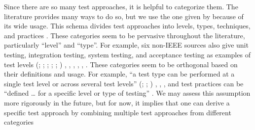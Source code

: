 Since there are so many test approaches, it is helpful to categorize them.
The literature provides many ways to do so, but we use the one given by
\ifnotpaper\else \citeauthor{IEEE2022} \fi \citet{IEEE2022} because of its wide usage.
This schema divides test approaches into levels, types, techniques, and practices
\citeyearpar[Fig.~2; see ]{IEEE2022}. These categories seem
to be pervasive throughout the literature, particularly ``level'' and ``type''.
\label{nonIEEE-sources}%
For example, six non-IEEE sources also give unit testing, integration testing,
system testing, and acceptance testing as examples of test levels \ifnotpaper
    (\citealp[pp.~5\=/6 to 5\=/7]{SWEBOK2025}; \citealpISTQB{};
    \citealp[pp.~807\==808]{Perry2006}; \citealp[pp.~443\==445]{PetersAndPedrycz2000};
    \citealp[p.~218]{KuļešovsEtAl2013};
    \citealp[pp.~9, 13]{Gerrard2000a})\else
    \cite[pp.~443\==445]{PetersAndPedrycz2000},
    \cite[pp.~5\=/6 to 5\=/7]{SWEBOK2025}, \cite{ISTQB},
    \cite[pp.~807\==808]{Perry2006}, \cite[pp.~9, 13]{Gerrard2000a},
    \cite[p.~218]{KuļešovsEtAl2013}\fi.\label{orth-approach}
These categories seem to be orthogonal based on their definitions and usage.
For example, ``a test type can be performed at a single test level or across
several test levels'' \ifnotpaper (\citealp[p.~15]{IEEE2022};
    \citeyear[p.~8]{IEEE2021a}; \citeyear[p.~7]{IEEE2021c})\else
    \cite[p.~15]{IEEE2022}, \cite[p.~7]{IEEE2021c}, \cite[p.~8]{IEEE2021a}\fi,
and test practices can be ``defined \dots{} for a specific level or type of
testing'' \citeyearpar[p.~9]{IEEE2021b}.
We may assess this assumption more rigorously in the future, but for now, it
implies that one can derive a specific test approach by combining multiple
test approaches from different categories\ifnotpaper
